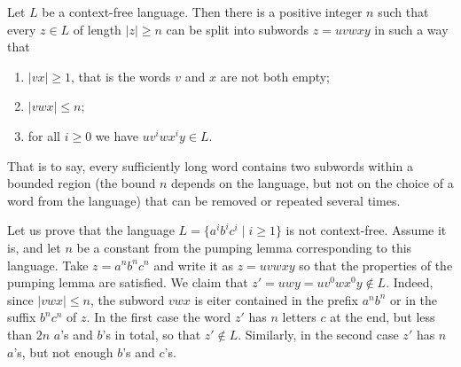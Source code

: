 \begin{page}
\setcounter{section}{7}
\setcounter{subsection}{2}
\setcounter{dfn}{3}
\label{portion:1156}

\begin{thm}
\label{thm:PumpCFL}
Let $L$ be a context-free language.
Then there is a positive integer $n$ such that every $z \in L$ of length $|z| \ge n$ can be split into subwords $z = uvwxy$ in such a way that
\begin{enumerate}
\item
$|vx| \ge 1$, that is the words $v$ and $x$ are not both empty;
\item
$|vwx| \le n$;
\item
for all $i \ge 0$ we have $uv^iwx^iy \in L$.
\end{enumerate}
\end{thm}

\end{page}

\begin{page}
\setcounter{section}{7}
\setcounter{subsection}{2}
\setcounter{dfn}{3}
\label{portion:1157}

That is to say, every sufficiently long word contains two subwords within a bounded region
(the bound $n$ depends on the language, but not on the choice of a word from the language)
that can be removed or repeated several times.


\end{page}

\begin{page}
\setcounter{section}{7}
\setcounter{subsection}{2}
\setcounter{dfn}{4}
\label{portion:1159}

\begin{exl}
Let us prove that the language $L = \{a^ib^ic^i \mid i \ge 1\}$ is not context-free.
Assume it is, and let $n$ be a constant from the pumping lemma corresponding to this language.
Take $z = a^nb^nc^n$ and write it as $z = uvwxy$ so that the properties of the pumping lemma are satisfied.
We claim that $z' = uwy = uv^0wx^0y \notin L$.
Indeed, since $|vwx| \le n$, the subword $vwx$ is eiter contained in the prefix $a^nb^n$ or in the suffix $b^nc^n$ of $z$.
In the first case the word $z'$ has $n$ letters $c$ at the end, but less than $2n$ $a$'s and $b$'s in total, so that $z' \notin L$.
Similarly, in the second case $z'$ has $n$ $a$'s, but not enough $b$'s and $c$'s.
\end{exl}

\end{page}


